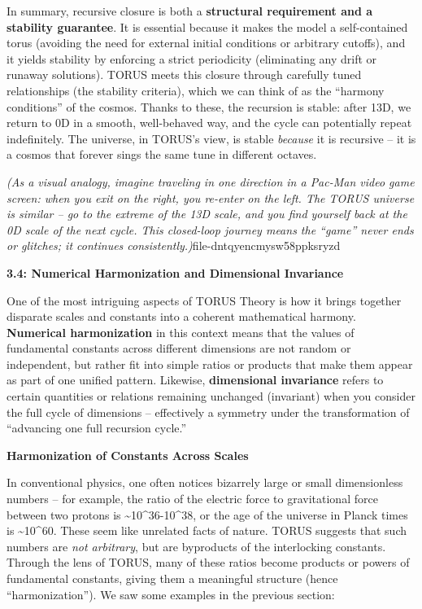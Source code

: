 \documentclass[]{article}
\begin{document}
In summary, recursive closure is both a \textbf{structural requirement
and a stability guarantee}. It is essential because it makes the model a
self-contained torus (avoiding the need for external initial conditions
or arbitrary cutoffs), and it yields stability by enforcing a strict
periodicity (eliminating any drift or runaway solutions). TORUS meets
this closure through carefully tuned relationships (the stability
criteria), which we can think of as the ``harmony conditions'' of the
cosmos. Thanks to these, the recursion is stable: after 13D, we return
to 0D in a smooth, well-behaved way, and the cycle can potentially
repeat indefinitely. The universe, in TORUS's view, is stable
\emph{because} it is recursive -- it is a cosmos that forever sings the
same tune in different octaves.

\emph{(As a visual analogy, imagine traveling in one direction in a
Pac-Man video game screen: when you exit on the right, you re-enter on
the left. The TORUS universe is similar -- go to the extreme of the 13D
scale, and you find yourself back at the 0D scale of the next cycle.
This closed-loop journey means the ``game'' never ends or glitches; it
continues consistently.)}​file-dntqyencmysw58ppksryzd

\textbf{3.4: Numerical Harmonization and Dimensional Invariance}

One of the most intriguing aspects of TORUS Theory is how it brings
together disparate scales and constants into a coherent mathematical
harmony. \textbf{Numerical harmonization} in this context means that the
values of fundamental constants across different dimensions are not
random or independent, but rather fit into simple ratios or products
that make them appear as part of one unified pattern. Likewise,
\textbf{dimensional invariance} refers to certain quantities or
relations remaining unchanged (invariant) when you consider the full
cycle of dimensions -- effectively a symmetry under the transformation
of ``advancing one full recursion cycle.''

\textbf{Harmonization of Constants Across Scales}

In conventional physics, one often notices bizarrely large or small
dimensionless numbers -- for example, the ratio of the electric force to
gravitational force between two protons is
\textasciitilde{}10\^{}36-10\^{}38, or the age of the universe in Planck
times is \textasciitilde{}10\^{}60. These seem like unrelated facts of
nature. TORUS suggests that such numbers are \emph{not arbitrary}, but
are byproducts of the interlocking constants. Through the lens of TORUS,
many of these ratios become products or powers of fundamental constants,
giving them a meaningful structure (hence ``harmonization''). We saw
some examples in the previous section:
\end{document}
